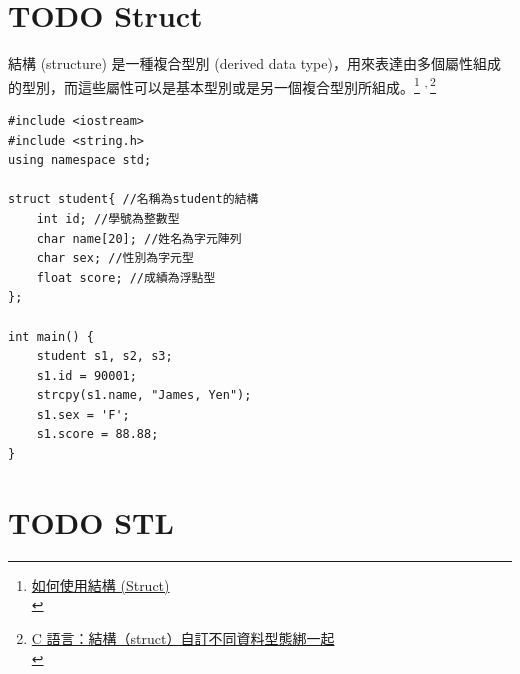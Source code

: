 \documentclass[a4paper,12pt]{article}
\begin{document}
\section{{\bfseries\sffamily TODO} Struct}
\label{cpp_struct}
結構 (structure) 是一種複合型別 (derived data type)，用來表達由多個屬性組成的型別，而這些屬性可以是基本型別或是另一個複合型別所組成。\footnote{\href{https://michaelchen.tech/c-programming/struct/}{如何使用結構 (Struct)}\\} \textsuperscript{,}\,\footnote{\href{https://kopu.chat/2017/05/30/c-\%E8\%AA\%9E\%E8\%A8\%80\%EF\%BC\%9A\%E7\%B5\%90\%E6\%A7\%8B\%EF\%BC\%88struct\%EF\%BC\%89\%E8\%87\%AA\%E8\%A8\%82\%E4\%B8\%8D\%E5\%90\%8C\%E8\%B3\%87\%E6\%96\%99\%E5\%9E\%8B\%E6\%85\%8B\%E7\%B6\%81\%E4\%B8\%80\%E8\%B5\%B7/}{C 語言：結構（struct）自訂不同資料型態綁一起}\\}\\
\lstset{breaklines=true,language=cpp,label= ,caption= ,captionpos=b,firstnumber=1,numbers=left}
\begin{lstlisting}
#include <iostream>
#include <string.h>
using namespace std;

struct student{ //名稱為student的結構
    int id; //學號為整數型
    char name[20]; //姓名為字元陣列
    char sex; //性別為字元型
    float score; //成績為浮點型
};

int main() {
    student s1, s2, s3;
    s1.id = 90001;
    strcpy(s1.name, "James, Yen");
    s1.sex = 'F';
    s1.score = 88.88;
}

\end{lstlisting}

\section{{\bfseries\sffamily TODO} STL}
\label{sec:org69340d5}
\end{document}
